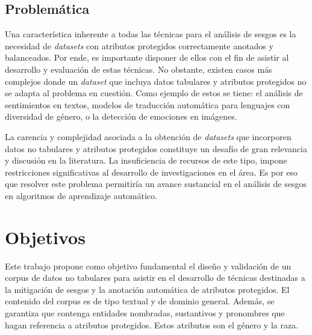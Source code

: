 
\subsection*{Problem\'atica}
Una caracter\'istica inherente a todas las t\'ecnicas para el an\'alisis de sesgos es la necesidad de \emph{datasets} con 
atributos protegidos correctamente anotados y balanceados. Por ende, es importante disponer de ellos con el fin de 
asistir al desarrollo y evaluaci\'on de estas t\'ecnicas. No obstante, existen casos m\'as complejos donde un \emph{dataset} que incluya 
datos tabulares y atributos protegidos no se adapta al problema en cuesti\'on. Como ejemplo de estos se tiene:  
el an\'alisis de sentimientos en textos, modelos de traducci\'on autom\'atica para lenguajes con diversidad 
de g\'enero, o la detecci\'on de emociones en im\'agenes.

La carencia y complejidad asociada a la obtenci\'on de \emph{datasets} que incorporen datos no tabulares y atributos protegidos constituye un 
desaf\'io de gran relevancia y discusi\'on en la literatura. La insuficiencia de recursos de este tipo, impone restricciones 
significativas al desarrollo de investigaciones en el \'area. Es por eso que resolver este problema permitir\'ia un avance sustancial 
en el an\'alisis de sesgos en algoritmos de aprendizaje autom\'atico.

\section*{Objetivos}
Este trabajo propone como objetivo fundamental el dise\~no y validaci\'on de un corpus de datos no tabulares para
asistir en el desarrollo de t\'ecnicas destinadas a la mitigaci\'on de sesgos y la anotaci\'on autom\'atica de atributos protegidos. 
El contenido del corpus es de tipo textual y de dominio general. Adem\'as, se garantiza que contenga entidades nombradas, sustantivos 
y pronombres que hagan referencia a atributos protegidos. Estos atributos son el g\'enero y la raza.

